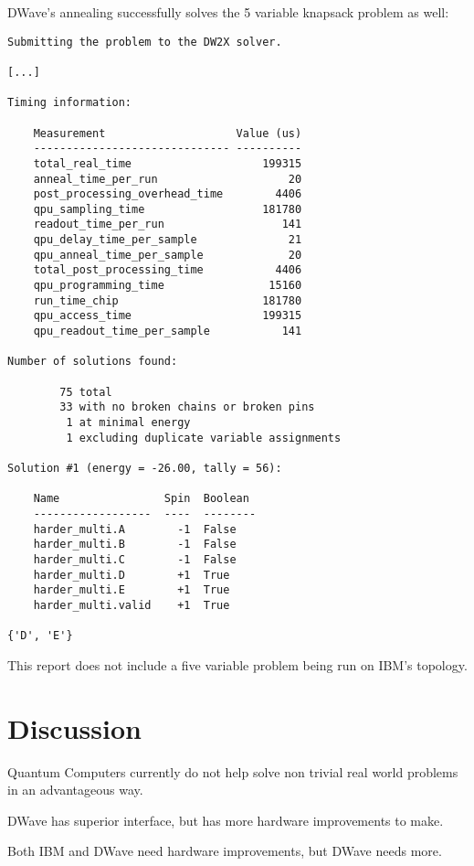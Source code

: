 \documentclass{article}
\begin{document}
DWave's annealing successfully solves the 5 variable knapsack problem as well:

\begin{verbatim}
Submitting the problem to the DW2X solver.

[...]

Timing information:

    Measurement                    Value (us)
    ------------------------------ ----------
    total_real_time                    199315
    anneal_time_per_run                    20
    post_processing_overhead_time        4406
    qpu_sampling_time                  181780
    readout_time_per_run                  141
    qpu_delay_time_per_sample              21
    qpu_anneal_time_per_sample             20
    total_post_processing_time           4406
    qpu_programming_time                15160
    run_time_chip                      181780
    qpu_access_time                    199315
    qpu_readout_time_per_sample           141

Number of solutions found:

        75 total
        33 with no broken chains or broken pins
         1 at minimal energy
         1 excluding duplicate variable assignments

Solution #1 (energy = -26.00, tally = 56):

    Name                Spin  Boolean
    ------------------  ----  --------
    harder_multi.A        -1  False  
    harder_multi.B        -1  False  
    harder_multi.C        -1  False  
    harder_multi.D        +1  True   
    harder_multi.E        +1  True   
    harder_multi.valid    +1  True    

{'D', 'E'}
\end{verbatim}

This report does not include a five variable problem being run on IBM's topology.

\section{Discussion}

Quantum Computers currently do not help solve non trivial real world problems in an advantageous way.

DWave has superior interface, but has more hardware improvements to make.

Both IBM and DWave need hardware improvements, but DWave needs more.
\end{document}
